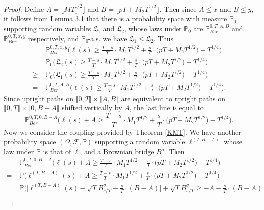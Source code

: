 \begin{proof}
	Define $A = \lfloor MT_1^{1/2}\rfloor$ and $B = \lfloor pT + M_2 T^{1/2}\rfloor$. Then since $A\leq x$ and $B\leq y$, it follows from Lemma 3.1 that there is a probability space with measure $\mathbb{P}_0$ supporting random variables $\mathfrak{L}_1$ and $\mathfrak{L}_2$, whose laws under $\mathbb{P}_0$ are $\mathbb{P}^{0,T,A,B}_{Ber}$ and $\mathbb{P}^{0,T,x,y}_{Ber}$ respectively, and $\mathbb{P}_0$-a.s. we have $\mathfrak{L}_1\leq \mathfrak{L}_2$. Thus
	\begin{align*}
	&\mathbb{P}^{0,T,x,y}_{Ber}\Big( \ell(s)  \geq \frac{T-s}{T} \cdot M_1 T^{1/2} + \frac{s}{T} \cdot \big(p T + M_2 T^{1/2}\big) - T^{1/4} \Big)\\
	= \; & \mathbb{P}_0\Big( \mathfrak{L}_2(s)  \geq \frac{T-s}{T} \cdot M_1 T^{1/2} + \frac{s}{T} \cdot \big(p T + M_2 T^{1/2}\big) - T^{1/4} \Big)\\
	\geq \; & \mathbb{P}_0\Big( \mathfrak{L}_1(s)  \geq \frac{T-s}{T} \cdot M_1 T^{1/2} + \frac{s}{T} \cdot \big(p T + M_2 T^{1/2}\big) - T^{1/4} \Big)\\
	= \; & \mathbb{P}^{0,T,A,B}_{Ber}\Big( \ell(s)  \geq \frac{T-s}{T} \cdot M_1 T^{1/2} + \frac{s}{T} \cdot \big(p T + M_2 T^{1/2}\big) - T^{1/4} \Big).
	\end{align*}
	Since upright paths on $\llbracket 0,T\rrbracket \times \llbracket A,B\rrbracket$ are equivalent to upright paths on $\llbracket 0,T\rrbracket \times \llbracket 0, B-A\rrbracket$ shifted vertically by $A$, the last line is equal to
	\[
	\mathbb{P}^{0,T,0,B-A}_{Ber}\Big( \ell(s) + A  \geq \frac{T-s}{T} \cdot M_1 T^{1/2} + \frac{s}{T} \cdot \big(p T + M_2 T^{1/2}\big) - T^{1/4} \Big).
	\]
	Now we consider the coupling provided by Theorem \ref{KMT}. We have another probability space $(\Omega,\mathcal{F},\mathbb{P})$ supporting a random variable $\ell^{(T,B-A)}$ whose law under $\mathbb{P}$ is that of $\ell$, and a Brownian bridge $B^\sigma$. Then 
	\begin{align*}
	&\mathbb{P}^{0,T,0,B-A}_{Ber}\Big( \ell(s) + A  \geq \frac{T-s}{T} \cdot M_1 T^{1/2} + \frac{s}{T} \cdot \big(p T + M_2 T^{1/2}\big) - T^{1/4} \Big)\\
	= \; & \mathbb{P}\Big( \ell^{(T,B-A)}(s) + A \geq \frac{T-s}{T} \cdot M_1 T^{1/2} + \frac{s}{T} \cdot \big(p T + M_2 T^{1/2}\big) - T^{1/4} \Big)\\
	= \; & \mathbb{P}\Big( \Big[\ell^{(T,B-A)}(s) - \sqrt{T} B^\sigma_{s/T} - \frac{s}{T}\cdot(B-A)\Big] + \sqrt{T}B^\sigma_{s/T} \geq -A-\frac{s}{T}\cdot(B-A) \\

\end{align*}
\end{proof}
